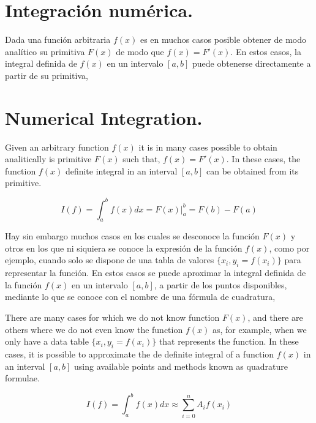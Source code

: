 \begin{paracol}{2}
\section{Integración numérica.}\label{sec:inum}

Dada una función arbitraria $f(x)$ es en muchos casos posible obtener de modo analítico su primitiva $F(x)$ de modo que $f(x)=F'(x)$. En estos casos, la integral definida de $f(x)$ en un intervalo $[a,b]$ puede obtenerse directamente a partir de su primitiva,

\switchcolumn
\section{Numerical Integration.}
Given an arbitrary function $f(x)$ it is in many cases possible to obtain analitically is primitive $F(x)$ such that, $f(x)=F'(x)$. In these cases, the function $f(x)$ definite integral in an interval $[a,b]$ can be obtained from its primitive.

\end{paracol}
\begin{equation*}
I(f)=\int_a^bf(x)dx=F(x)\vert_a^b=F(b)-F(a)
\end{equation*}
\begin{paracol}{2}
Hay sin embargo muchos casos en los cuales se desconoce la función $F(x)$ y otros en los que ni siquiera se conoce la expresión de la función $f(x)$, como por ejemplo, cuando solo se dispone de una tabla de valores $\{ x_i,y_i=f(x_i) \}$ para representar la función. En estos casos se puede aproximar la integral definida de la función $f(x)$ en un intervalo $[a,b]$, a partir de los puntos disponibles, mediante lo que se conoce con el nombre de una fórmula de cuadratura,

\switchcolumn
There are many cases for which we do not know function $F(x)$, and there are others where we do not even know the function $f(x)$ as, for example, when we only have a data table $\{x_i,y_i = f(x_i)\}$ that represents the function. In these cases, it is possible to approximate the de definite integral of a function $f(x)$ in an interval $[a,b]$ using available points and methods known as quadrature formulae.
\end{paracol}
\begin{equation*}
I(f)=\int_a^bf(x)dx \approx \sum_{i=0}^nA_if(x_i)
\end{equation*}
